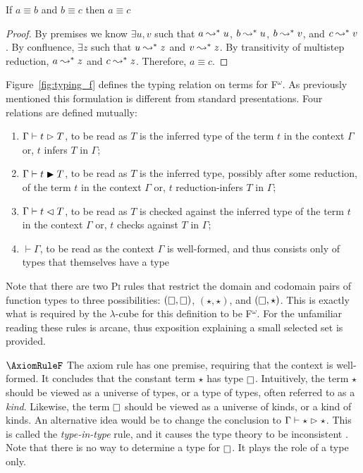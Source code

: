 \begin{theorem}
    If $a \equiv b$ and $b \equiv c$ then $a \equiv c$
    \label{thm:1:trans}
\end{theorem}
\begin{proof}
    By premises we know $\exists u, v$ such that $a \leadsto^* u$, $b \leadsto^* u$, $b \leadsto^* v$, and $c \leadsto^* v$.
    By confluence, $\exists z$ such that $u \leadsto^* z$ and $v \leadsto^* z$.
    By transitivity of multistep reduction, $a \leadsto^* z$ and $c \leadsto^* z$.
    Therefore, $a \equiv c$.
\end{proof}



Figure~\ref{fig:typing_f} defines the typing relation on terms for F$^\omega$.
As previously mentioned this formulation is different from standard presentations.
Four relations are defined mutually:
\begin{enumerate}
    \item $\Gamma \vdash t \vartriangleright T$, to be read as $T$ is the inferred type of the term $t$ in the context $\Gamma$ or, $t$ infers $T$ in $\Gamma$;
    \item $\Gamma \vdash t \blacktriangleright T$, to be read as $T$ is the inferred type, possibly after some reduction, of the term $t$ in the context $\Gamma$ or, $t$ reduction-infers $T$ in $\Gamma$;
    \item $\Gamma \vdash t \vartriangleleft T$, to be read as $T$ is checked against the inferred type of the term $t$ in the context $\Gamma$ or, $t$ checks against $T$ in $\Gamma$;
    \item $\vdash \Gamma$, to be read as the context $\Gamma$ is well-formed, and thus consists only of types that themselves have a type
\end{enumerate}
Note that there are two \textsc{Pi} rules that restrict the domain and codomain pairs of function types to three possibilities: $(\kind, \kind)$, $(\star, \star)$, and $(\kind, \star)$.
This is exactly what is required by the $\lambda$-cube for this definition to be F$^\omega$.
For the unfamiliar reading these rules is arcane, thus exposition explaining a small selected set is provided.

$\AxiomRuleF$ The axiom rule has one premise, requiring that the context is well-formed.
It concludes that the constant term $\star$ has type $\kind$.
Intuitively, the term $\star$ should be viewed as a universe of types, or a type of types, often referred to as a \textit{kind}.
Likewise, the term $\kind$ should be viewed as a universe of kinds, or a kind of kinds.
An alternative idea would be to change the conclusion to $\Gamma \vdash \star \vartriangleright \star$.
This is called the \textit{type-in-type} rule, and it causes the type theory to be inconsistent \cite{girard1972,hurkens1995}.
Note that there is no way to determine a type for $\kind$.
It plays the role of a type only.

